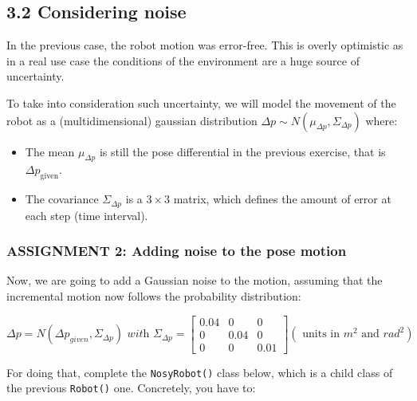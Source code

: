 \documentclass[11pt]{article}
\providecommand{\tightlist}{%
      \setlength{\itemsep}{0pt}\setlength{\parskip}{0pt}}
\begin{document}
    
    \hypertarget{considering-noise}{%
\subsection{3.2 Considering noise}\label{considering-noise}}

In the previous case, the robot motion was error-free. This is overly
optimistic as in a real use case the conditions of the environment are a
huge source of uncertainty.

To take into consideration such uncertainty, we will model the movement
of the robot as a (multidimensional) gaussian distribution
\(\Delta p \sim N(\mu_{\Delta p},\Sigma_{\Delta p})\) where:

\begin{itemize}
\tightlist
\item
  The mean \(\mu_{\Delta p}\) is still the pose differential in the
  previous exercise, that is \(\Delta p_{\text{given}}\).
\item
  The covariance \(\Sigma_{\Delta p}\) is a \(3 \times 3\) matrix, which
  defines the amount of error at each step (time interval).
\end{itemize}

    \hypertarget{assignment-2-adding-noise-to-the-pose-motion}{%
\subsubsection{\texorpdfstring{\textbf{{ASSIGNMENT 2: Adding noise to
the pose
motion}}}{ASSIGNMENT 2: Adding noise to the pose motion}}\label{assignment-2-adding-noise-to-the-pose-motion}}

Now, we are going to add a Gaussian noise to the motion, assuming that
the incremental motion now follows the probability distribution:

\[
    \Delta p = N(\Delta p_{given}, \Sigma_{\Delta p})
    \textit{ with } 
    \Sigma_{\Delta p}  =
        \begin{bmatrix}
            0.04 & 0 & 0 \\
            0 & 0.04 & 0 \\
            0 & 0 & 0.01
        \end{bmatrix}
    (\text{ units in }m^2 \text{ and } rad^2)
\]

For doing that, complete the \texttt{NosyRobot()} class below, which is
a child class of the previous \texttt{Robot()} one. Concretely, you have
to:
\end{document}
